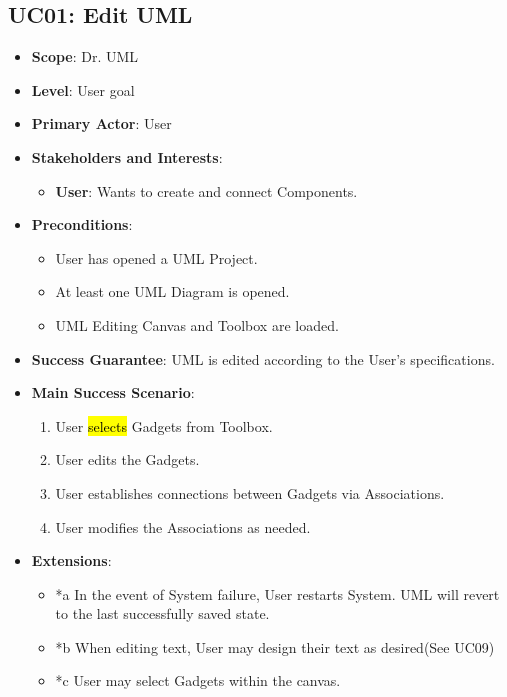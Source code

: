 \documentclass[12pt]{article}
\begin{document}
    \subsection{UC01: Edit UML}
    \begin{itemize}
        \item \textbf{Scope}: Dr. UML
        \item \textbf{Level}: User goal
        \item \textbf{Primary Actor}: User
        \item \textbf{Stakeholders and Interests}:
        \begin{itemize}
            \item \textbf{User}: Wants to create and connect Components.
        \end{itemize}
        \item \textbf{Preconditions}:
        \begin{itemize}
            \item User has opened a UML Project.
            \item At least one UML Diagram is opened.
            \item UML Editing Canvas and Toolbox are loaded.
        \end{itemize}
        \item \textbf{Success Guarantee}: UML is edited according to the User’s specifications.
        \item \textbf{Main Success Scenario}:
        \begin{enumerate}
            \item User \hl{selects} Gadgets from Toolbox.
            \item User edits the Gadgets.
            \item User establishes connections between Gadgets via Associations.
            \item User modifies the Associations as needed.
        \end{enumerate}
        \item \textbf{Extensions}:
        \begin{itemize}
            \item *a In the event of System failure, User restarts System.
            UML will revert to the last successfully saved state.
            \item *b When editing text, User may design their text as desired(See UC09)
            \item *c User may select Gadgets within the canvas.

\end{itemize}
\end{itemize}
\end{document}
